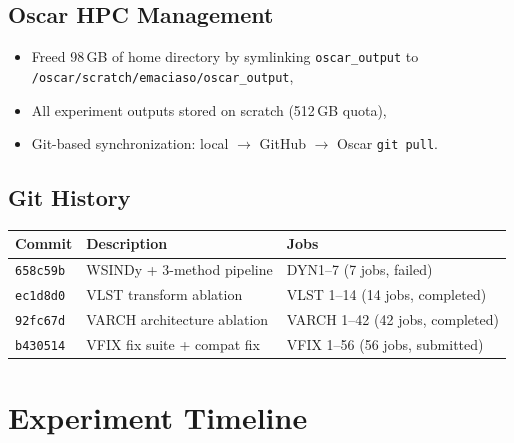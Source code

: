 \documentclass[11pt,letterpaper]{article}
\begin{document}
\subsection{Oscar HPC Management}
\begin{itemize}[nosep]
  \item Freed 98\,GB of home directory by symlinking \texttt{oscar\_output}
        to \texttt{/oscar/scratch/emaciaso/oscar\_output},
  \item All experiment outputs stored on scratch (512\,GB quota),
  \item Git-based synchronization: local $\to$ GitHub $\to$ Oscar \texttt{git pull}.
\end{itemize}

\subsection{Git History}
\begin{center}
\small
\begin{tabular}{@{}lll@{}}
\toprule
Commit & Description & Jobs \\
\midrule
\texttt{658c59b} & WSINDy + 3-method pipeline  & DYN1--7 (7 jobs, failed) \\
\texttt{ec1d8d0} & VLST transform ablation     & VLST 1--14 (14 jobs, completed) \\
\texttt{92fc67d} & VARCH architecture ablation  & VARCH 1--42 (42 jobs, completed) \\
\texttt{b430514} & VFIX fix suite + compat fix  & VFIX 1--56 (56 jobs, submitted) \\
\bottomrule
\end{tabular}
\end{center}


\section{Experiment Timeline}
\label{sec:timeline}
\end{document}
